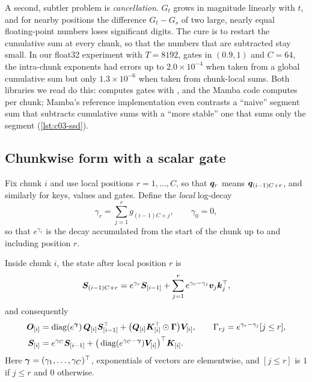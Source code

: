 A second, subtler problem is \emph{cancellation}. $G_t$ grows in magnitude linearly with $t$,
and for nearby positions the difference $G_t-G_s$ of two large, nearly equal floating-point
numbers loses significant digits. The cure is to restart the cumulative sum at every chunk, so that the
numbers that are subtracted stay small. In our float32 experiment with $T=8192$, gates in
$(0.9,1)$ and $C=64$, the intra-chunk exponents had errors up to $2.0\times10^{-4}$ when taken
from a global cumulative sum but only $1.3\times10^{-6}$ when taken from chunk-local sums. Both
libraries we read do this: \fla{} computes gates with , and the Mamba
code computes  per chunk; Mamba's reference implementation even contrasts a
``naive'' segment sum that subtracts cumulative sums with a ``more stable'' one that sums only
the segment (\cref{lst:c03-ssd}).

\subsection{Chunkwise form with a scalar gate}

Fix chunk $i$ and use local positions $r=1,\dots,C$, so that $\bm{q}_r$ means
$\bm{q}_{(i-1)C+r}$, and similarly for keys, values and gates. Define the \emph{local} log-decay
\[
  \gamma_r=\sum_{j=1}^{r}g_{(i-1)C+j},\qquad \gamma_0=0,
\]
so that $e^{\gamma_r}$ is the decay accumulated from the start of the chunk up to and including
position $r$.

\begin{proposition}\label{prop:c03-chunk-gated}
Inside chunk $i$, the state after local position $r$ is
\begin{equation}\label{eq:c03-chunk-gated-state}
  \bm{S}_{(i-1)C+r}=e^{\gamma_r}\bm{S}_{[i-1]}+\sum_{j=1}^{r}e^{\gamma_r-\gamma_j}\bm{v}_j\bm{k}_j^{\top} ,
\end{equation}
and consequently
\begin{align}
  \bm{O}_{[i]}&=\operatorname{diag}(e^{\bm\gamma})\,\bm{Q}_{[i]}\bm{S}_{[i-1]}^{\top}+\big(\bm{Q}_{[i]}\bm{K}_{[i]}^{\top}\odot\bm{\Gamma}\big)\bm{V}_{[i]},
  \qquad \Gamma_{rj}=e^{\gamma_r-\gamma_j}[j\le r],\label{eq:c03-chunk-gated-out}\\
  \bm{S}_{[i]}&=e^{\gamma_C}\bm{S}_{[i-1]}+\big(\operatorname{diag}(e^{\gamma_C-\bm\gamma})\bm{V}_{[i]}\big)^{\top}\bm{K}_{[i]} .
  \label{eq:c03-chunk-gated-next}
\end{align}
Here $\bm\gamma=(\gamma_1,\dots,\gamma_C)^{\top}$, exponentials of vectors are elementwise, and
$[j\le r]$ is $1$ if $j\le r$ and $0$ otherwise.
\end{proposition}

